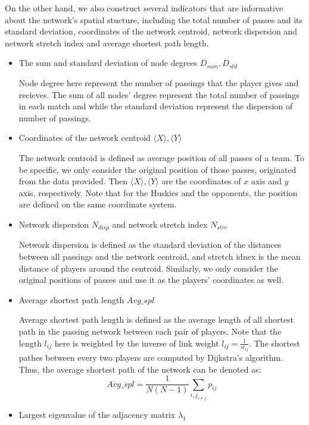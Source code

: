 \documentclass{mcmthesis}
\begin{document}
On the other hand, we also construct several indicators that are informative about the network's spatial stucture, including the total number of passes and its standard deviation, coordinates of the network centroid, network dispersion and network stretch index and average shortest path length.
\begin{itemize}
  \item The sum and standard deviation of node degrees $D_{sum}, D_{std}$
  
  Node degree here represent the number of passings that the player gives and recieves. The sum of all nodes' degree represent the total number of passings in each match and while the standard deviation represent the dispersion of number of passings.
  \item Coordinates of the network centroid $\langle X\rangle,\langle Y\rangle$ 
  
  The network centroid is defined as average position of all passes of a team. To be specific, we only consider the original position of those passes, originated from the data provided. Then $\langle X\rangle,\langle Y\rangle$ are the coordinates of $x$ axis and $y$ axis, respectively. Note that for the Huskies and the opponents, the position are defined on the same coordinate system.\cite{1}
  \item Network dispersion $N_{disp}$ and network stretch index $N_{stre}$
  
  Network dispersion is defined as the standard deviation of the distances between all passings and the network centroid, and stretch idnex is the mean distance of players around the centroid. Similarly, we only consider the original positions of passes and use it as the players' coordinates as well.\cite{1}
  \item Average shortest path length $Avg\_spl$ 
  
  Average shortest path length is defined as the average length of all shortest path in the passing network between each pair of players. Note that the length $l_{ij}$ here is weighted by the inverse of link weight $l_{ij}=\frac{1}{w_{ij}}$. The shortest pathes between every two players are computed by Dijkstra’s algorithm.\cite{1} Thus, the average shortest path of the network can be denoted as:
  \begin{equation}
    Avg\_spl = \frac{1}{N(N-1)}\sum_{i,j_{i\not=j}}p_{ij}
  \end{equation}
  \item Largest eigenvalue of the adjacency matrix $\lambda_1$
  

\end{itemize}
\end{document}
